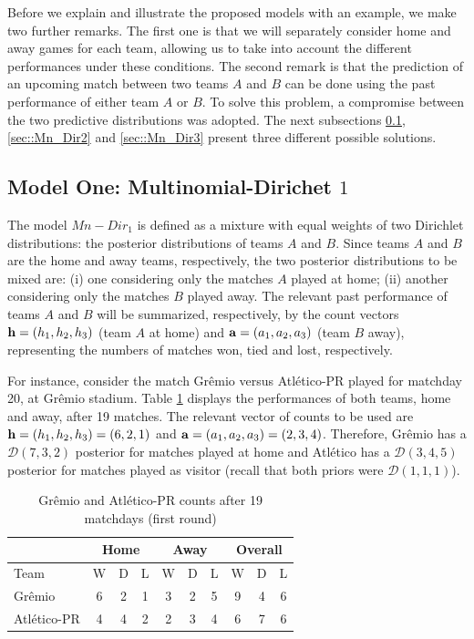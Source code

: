 \documentclass[journal,article,accept,moreauthors,pdftex,12pt,a4paper]{mdpi}
\begin{document}
	Before we explain and illustrate the proposed models with an example, we make two further remarks.
	The first one is that we will separately consider home and away games for each team, allowing us to take into account the different performances under these conditions.
	The second remark is that the prediction of an upcoming match between two teams $A$ and $B$ can be done using
	the past performance of either team $A$ or $B$.
	To solve this problem, a compromise between the two predictive distributions was adopted.
	The next subsections \ref{sec::Mn_Dir1}, \ref{sec::Mn_Dir2} and \ref{sec::Mn_Dir3} present three different possible solutions.
	
	\subsection{Model One: Multinomial-Dirichet $1$}
	\label{sec::Mn_Dir1}
	
	The model $Mn-Dir_1$ is defined as a mixture with equal weights of two Dirichlet distributions: the posterior distributions of teams $A$ and $B$.
	Since teams $A$ and $B$ are the home and away teams, respectively, the two posterior distributions to be mixed are: (i) one considering only the matches $A$ played at home; (ii) another considering only the matches $B$ played away.
	The relevant past performance of teams $A$ and $B$ will be summarized, respectively, by the count vectors ${\bf h} = (h_1, h_2, h_3)$ (team $A$ at home) and ${\bf a} = (a_1, a_2, a_3)$ (team $B$ away), representing the numbers of matches won, tied and lost, respectively.
	
	For instance, consider the match Gr\^emio versus Atl\'etico-PR played for matchday 20, at Gr\^emio stadium. Table \ref{tab:counts} displays the performances of both teams, home and away, after 19
	matches. The relevant vector of counts to be used are ${\bf h}=(h_1,h_2,h_3)=(6,2,1)$ and ${\bf a}=(a_1,a_2,a_3)=(2,3,4)$.
	Therefore, Gr\^emio has a $\mathcal{D}(7,3,2)$ posterior for matches played at home and Atl\'etico has a $\mathcal{D}(3,4,5)$ posterior for matches played as visitor (recall that both priors were
	$\mathcal{D}(1,1,1)$).
	
	\begin{table}[!h]
		\begin{center}
			\begin{tabular}{lccccccccc}
				
				\hline
				& \multicolumn{3}{c}{Home} & \multicolumn{3}{c}{Away}& \multicolumn{3}{c}{Overall} \\
				\hline
				\hline
				Team & W & D & L & W & D & L & W & D & L\\
				\hline
				Gr\^emio & 6 & 2 & 1 & 3 & 2 & 5 & 9 & 4 & 6\\
				Atl\'etico-PR & 4 & 4 & 2 & 2 & 3 & 4 & 6 & 7 & 6\\
				\hline
			\end{tabular}
			\caption{Gr\^emio and Atl\'etico-PR counts after 19 matchdays (first round)}\label{tab:counts}
		\end{center}
	\end{table}
	
\end{document}
